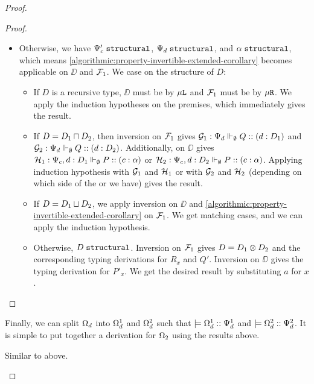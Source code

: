 \begin{proof}
\begin{description}
\begin{proof}
\begin{itemize}
      \item Otherwise, we have $\Psi_c'\;\mathtt{structural}$, $\Psi_d\;\mathtt{structural}$, and $\alpha\;\mathtt{structural}$, which means \cref{algorithmic:property-invertible-extended-corollary} becomes applicable on $\DD$ and $\mathcal{F}_1$. We case on the structure of $D$:
        \begin{itemize}
          \item If $D$ is a recursive type, $\DD$ must be by $\mu\texttt{L}$ and $\mathcal{F}_1$ must be by $\mu\texttt{R}$. We apply the induction hypotheses on the premises, which immediately gives the result.
          \item If $D = D_1 \mathbin{\sqcap} D_2$, then inversion on $\mathcal{F}_1$ gives $\mathcal{G}_1 : {\Psi_d} \Vdash_{\emptyset} Q :: (d : D_1)$ and $\mathcal{G}_2 : {\Psi_d} \Vdash_{\emptyset} Q :: (d : D_2)$. Additionally,  on $\DD$ gives $\mathcal{H}_1 : {\Psi_c, d : D_1} \Vdash_{\emptyset} P :: (c : \alpha)$ or $\mathcal{H}_2 : {\Psi_c, d : D_2} \Vdash_{\emptyset} P :: (c : \alpha)$. Applying induction hypothesis with $\mathcal{G}_1$ and $\mathcal{H}_1$ or with $\mathcal{G}_2$ and $\mathcal{H}_2$ (depending on which side of the or we have) gives the result.

          \item If $D = D_1 \mathbin{\sqcup} D_2$, we apply inversion on $\DD$ and \cref{algorithmic:property-invertible-extended-corollary} on $\mathcal{F}_1$. We get matching cases, and we can apply the induction hypothesis.

          \item Otherwise, $D\;\mathtt{structural}$. Inversion on $\mathcal{F}_1$ gives $D = D_1 \otimes D_2$ and the corresponding typing derivations for $R_x$ and $Q'$. Inversion on $\DD$ gives the typing derivation for $P'_x$. We get the desired result by substituting $a$ for $x$.
        \end{itemize}
    \end{itemize}
  \end{proof}
  Finally, we can split $\Omega_d$ into $\Omega_d^1$ and $\Omega_d^2$ such that $\models {\Omega_d^1} :: {\Psi_d^1}$ and $\models {\Omega_d^2} :: {\Psi_d^2}$. It is simple to put together a derivation for $\Omega_2$ using the results above.


  \item [\irb{internal}, \irb{lolli}, \irb{external} :] Similar to above.

  \end{description}
\end{proof}

